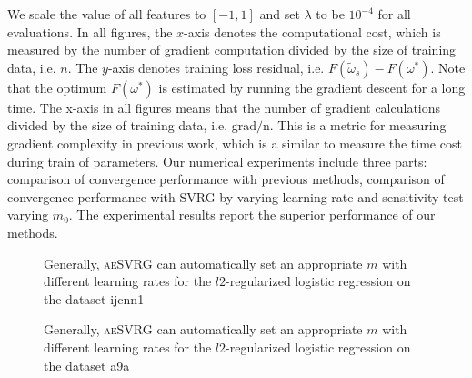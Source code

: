 \documentclass[conference]{IEEEtran}
\begin{document}
We scale the value of all features to $[-1,1]$ and set  $\lambda$ to be $10^{-4}$ for all evaluations. 
In all figures, the $x$-axis denotes the computational cost, which is measured by the number of gradient computation divided by the size of training data, i.e. $n$. The $y$-axis denotes training loss residual, i.e. $F(\tilde{\omega}_s) - F(\omega^{*})$. Note that the optimum $F(\omega^{*})$ is estimated by running the gradient descent for a long time. The x-axis in all figures means that the number of gradient calculations divided by the size of training data, i.e. $\mathrm{grad/n}$. This is a metric for measuring gradient complexity in previous work, which is a similar to measure the time cost during train of parameters. Our numerical experiments include three parts: comparison of convergence performance with previous methods, comparison of convergence performance with SVRG by varying learning rate and sensitivity test varying $m_0$. The experimental results report the superior performance of our methods. 

 \begin{figure*}[ht]
\centering
{}

\caption{Generally, \textsc{aeSVRG} can automatically set an appropriate $m$ with different learning rates for the $l2$-regularized logistic regression on the dataset ijcnn1}
\label{figure_logistic_ijcnn1}
\end{figure*}

\begin{figure*}[ht]
\centering
\subfigure[a9a $\eta=0.3$]{\texttt{[image: a9a03]}\label{a9a03}}
\subfigure[a9a $\eta=0.05$]{\texttt{[image: a9a005]}\label{a9a005}}
\subfigure[a9a $\eta=0.02$]{\texttt{[image: a9a002]}\label{a9a002}}
\subfigure[a9a $\eta=0.001$]{\texttt{[image: a9a0001]}\label{a9a0001}}

\caption{Generally, \textsc{aeSVRG} can automatically set an appropriate $m$ with different learning rates for the $l2$-regularized logistic regression on the dataset a9a}
\label{figure_logistic_a9a}
\end{figure*}
\end{document}
